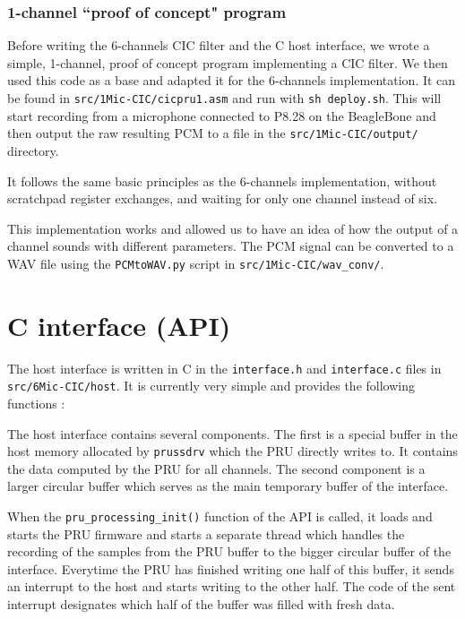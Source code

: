 \documentclass[]{report}
\begin{document}
\hypertarget{channel-proof-of-concept-program}{%
\subsubsection{1-channel ``proof of concept"
program}\label{channel-proof-of-concept-program}}

Before writing the 6-channels CIC filter and the C host interface, we wrote a simple, 1-channel, proof of concept program implementing a CIC filter. We then used this code as a base and adapted it for the 6-channels implementation. It can be found in \texttt{src/1Mic-CIC/cic\textunderscore pru1.asm} and run with \texttt{sh deploy.sh}. This will start recording from a microphone connected to P8.28 on the BeagleBone and then output the raw resulting PCM to a file in the \texttt{src/1Mic-CIC/output/} directory.

It follows the same basic principles as the 6-channels implementation, without scratchpad register exchanges, and waiting for only one channel instead of six.

This implementation works and allowed us to have an idea of how the output of a channel sounds with different parameters. The PCM signal can be converted to a WAV file using the \texttt{PCMtoWAV.py} script in \texttt{src/1Mic-CIC/wav\_conv/}.

\hypertarget{host-interface-and-api}{%
\section{C interface (API)}\label{host-interface-and-api}}

The host interface is written in C in the \texttt{interface.h} and
\texttt{interface.c} files in \texttt{src/6Mic-CIC/host}. It is currently very simple and provides the
following functions :



The host interface contains several components. The first is a special buffer in the host memory allocated by \texttt{prussdrv} which the PRU directly writes to. It contains the data computed by the PRU for all channels. The second component is a larger circular buffer which serves as the main temporary buffer of the interface.

When the \texttt{pru\_processing\_init()} function of the API is called, it loads and starts the PRU firmware and starts a separate thread which handles the recording of the samples from the PRU buffer to the bigger circular buffer of the interface. Everytime the PRU has finished writing one half of this buffer, it sends an interrupt to the host and starts writing to the other half. The code of the sent interrupt designates which half of the buffer was filled with fresh data.
\end{document}

